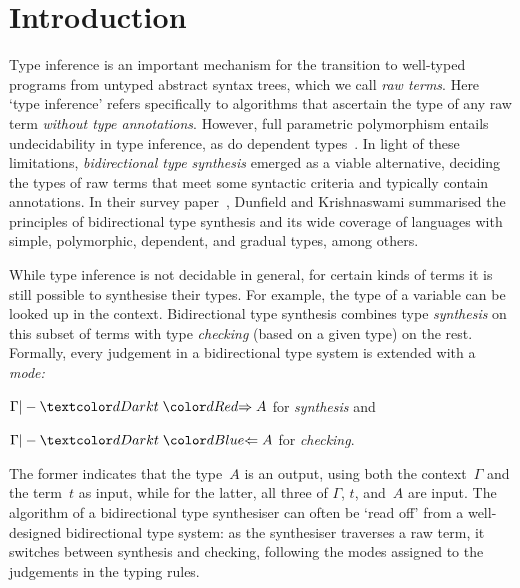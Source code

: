
\section{Introduction}\label{sec:intro}

Type inference is an important mechanism for the transition to well-typed programs from untyped abstract syntax trees, which we call \emph{raw terms}.
Here `type inference' refers specifically to algorithms that ascertain the type of any raw term \emph{without type annotations}.
However, full parametric polymorphism entails undecidability in type inference, as do dependent types~\cite{Wells1999,Dowek1993}.
In light of these limitations, \emph{bidirectional type synthesis} emerged as a viable alternative, deciding the types of raw terms that meet some syntactic criteria and typically contain annotations.
In their survey paper~\cite{Dunfield2021}, Dunfield and Krishnaswami summarised the principles of bidirectional type synthesis and its wide coverage of languages with simple, polymorphic, dependent, and gradual types, among others.

While type inference is not decidable in general, for certain kinds of terms it is still possible to synthesise their types.
For example, the type of a variable can be looked up in the context.
Bidirectional type synthesis combines type \emph{synthesis} on this subset of terms with type \emph{checking} (based on a given type) on the rest.
Formally, every judgement in a bidirectional type system is extended with a \emph{mode:}
\begin{inlineenum}
  \item $\Gamma |- \isTerm{t} \syn A$ for \emph{synthesis} and 
  \item $\Gamma |- \isTerm{t} \chk A$ for \emph{checking}.
\end{inlineenum}
The former indicates that the type~$A$ is an output, using both the context~$\Gamma$ and the term~$t$ as input, while for the latter, all three of $\Gamma$, $t$, and~$A$ are input.
The algorithm of a bidirectional type synthesiser can often be `read off' from a well-designed bidirectional type system: as the synthesiser traverses a raw term, it switches between synthesis and checking, following the modes assigned to the judgements in the typing rules.

